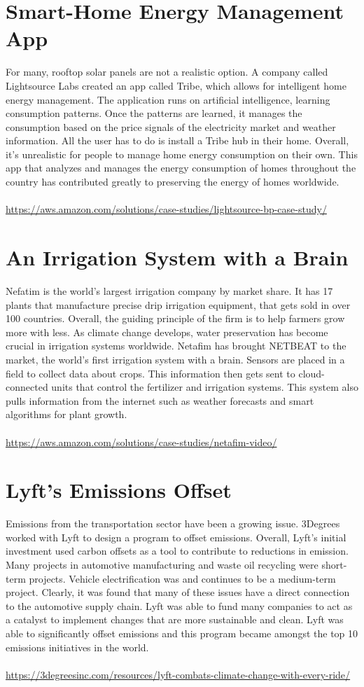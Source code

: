 \documentclass{article}
\begin{document}
\begin{spacing}{2.15}
    \section{Smart-Home Energy Management App}
    \indent For many, rooftop solar panels are not a realistic option. A company called Lightsource Labs created an app called Tribe, which allows for intelligent home energy management. The application runs on artificial intelligence, learning consumption patterns. Once the patterns are learned, it manages the consumption based on the price signals of the electricity market and weather information. All the user has to do is install a Tribe hub in their home. Overall, it's unrealistic for people to manage home energy consumption on their own. This app that analyzes and manages the energy consumption of homes throughout the country has contributed greatly to preserving the energy of homes worldwide.\\\\  
    \url{https://aws.amazon.com/solutions/case-studies/lightsource-bp-case-study/}
    \section{An Irrigation System with a Brain}
    \indent Nefatim is the world's largest irrigation company by market share. It has 17 plants that manufacture precise drip irrigation equipment, that gets sold in over 100 countries. Overall, the guiding principle of the firm is to help farmers grow more with less. As climate change develops, water preservation has become crucial in irrigation systems worldwide. Netafim has brought NETBEAT to the market, the world's first irrigation system with a brain. Sensors are placed in a field to collect data about crops. This information then gets sent to cloud-connected units that control the fertilizer and irrigation systems. This system also pulls information from the internet such as weather forecasts and smart algorithms for plant growth.\\\\
    \url{https://aws.amazon.com/solutions/case-studies/netafim-video/}
    \newpage
    \section{Lyft's Emissions Offset}
    \indent Emissions from the transportation sector have been a growing issue. 3Degrees worked with Lyft to design a program to offset emissions. Overall, Lyft's initial investment used carbon offsets as a tool to contribute to reductions in emission. Many projects in automotive manufacturing and waste oil recycling were short-term projects. Vehicle electrification was and continues to be a medium-term project. Clearly, it was found that many of these issues have a direct connection to the automotive supply chain. Lyft was able to fund many companies to act as a catalyst to implement changes that are more sustainable and clean. Lyft was able to significantly offset emissions and this program became amongst the top 10 emissions initiatives in the world.\\\\
    \url{https://3degreesinc.com/resources/lyft-combats-climate-change-with-every-ride/}

\end{spacing}
\end{document}
